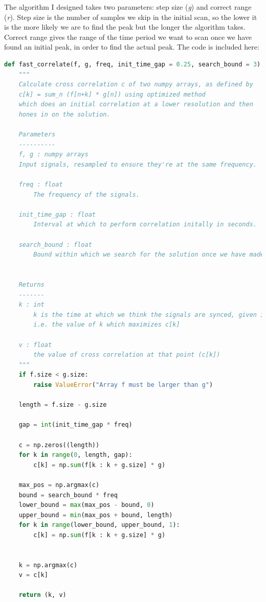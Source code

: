 \documentclass[12pt,a4paper,twoside,openright]{report}
\begin{document}
The algorithm I designed takes two parameters: step size (\emph{g}) and
correct range (\emph{r}). Step size is the number of samples we skip in the initial scan, so the
lower it is the more likely we are to find the peak but the longer the
algorithm takes. Correct range gives the range of the time period we want to
scan once we have found an initial peak, in order to find the actual peak. The
code is included here:
\begin{lstlisting}[language=Python]
def fast_correlate(f, g, freq, init_time_gap = 0.25, search_bound = 3):
    """
    Calculate cross correlation c of two numpy arrays, as defined by 
    c[k] = sum_n (f[n+k] * g[n]) using optimized method 
    which does an initial correlation at a lower resolution and then 
    hones in on the solution.

    Parameters
    ----------
    f, g : numpy arrays
    Input signals, resampled to ensure they're at the same frequency.

    freq : float
        The frequency of the signals.

    init_time_gap : float
        Interval at which to perform correlation initally in seconds. 

    search_bound : float
        Bound within which we search for the solution once we have made an initial pass.
        

    Returns
    -------
    k : int
        k is the time at which we think the signals are synced, given in terms of the number of samples through f we are.
        i.e. the value of k which maximizes c[k]

    v : float
        the value of cross correlation at that point (c[k])
    """
    if f.size < g.size:
        raise ValueError("Array f must be larger than g")

    length = f.size - g.size

    gap = int(init_time_gap * freq)

    c = np.zeros((length))
    for k in range(0, length, gap):
        c[k] = np.sum(f[k : k + g.size] * g)

    max_pos = np.argmax(c)
    bound = search_bound * freq
    lower_bound = max(max_pos - bound, 0)
    upper_bound = min(max_pos + bound, length)
    for k in range(lower_bound, upper_bound, 1):
        c[k] = np.sum(f[k : k + g.size] * g)


    k = np.argmax(c)
    v = c[k]

    return (k, v)
\end{lstlisting}
\end{document}
